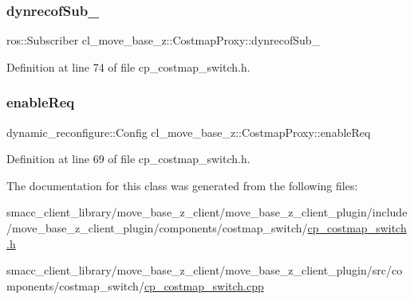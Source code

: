 \subsubsection{\texorpdfstring{dynrecof\+Sub\+\_\+}{dynrecofSub\_}}
{\footnotesize\ttfamily ros\+::\+Subscriber cl\+\_\+move\+\_\+base\+\_\+z\+::\+Costmap\+Proxy\+::dynrecof\+Sub\+\_\+\hspace{0.3cm}{\ttfamily [private]}}



Definition at line 74 of file cp\+\_\+costmap\+\_\+switch.\+h.

\mbox{\label{classcl__move__base__z_1_1CostmapProxy_aff2defa5d265d3e8efda4849eedd3500}} 
\subsubsection{\texorpdfstring{enable\+Req}{enableReq}}
{\footnotesize\ttfamily dynamic\+\_\+reconfigure\+::\+Config cl\+\_\+move\+\_\+base\+\_\+z\+::\+Costmap\+Proxy\+::enable\+Req\hspace{0.3cm}{\ttfamily [private]}}



Definition at line 69 of file cp\+\_\+costmap\+\_\+switch.\+h.



The documentation for this class was generated from the following files\+:\begin{DoxyCompactItemize}
\item 
smacc\+\_\+client\+\_\+library/move\+\_\+base\+\_\+z\+\_\+client/move\+\_\+base\+\_\+z\+\_\+client\+\_\+plugin/include/move\+\_\+base\+\_\+z\+\_\+client\+\_\+plugin/components/costmap\+\_\+switch/\hyperlink{cp__costmap__switch_8h}{cp\+\_\+costmap\+\_\+switch.\+h}\item 
smacc\+\_\+client\+\_\+library/move\+\_\+base\+\_\+z\+\_\+client/move\+\_\+base\+\_\+z\+\_\+client\+\_\+plugin/src/components/costmap\+\_\+switch/\hyperlink{cp__costmap__switch_8cpp}{cp\+\_\+costmap\+\_\+switch.\+cpp}\end{DoxyCompactItemize}
